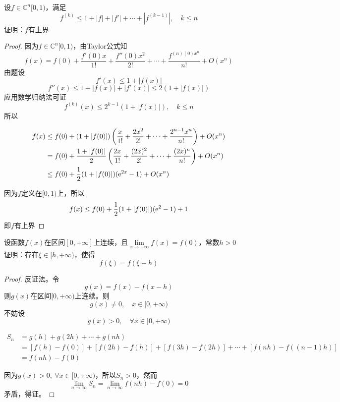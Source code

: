 \begin{proposition}
    
    设$f \in \mathbb{C}^{n}[0,1)$，满足
    $$f^{(k)} \leq 1 + |f| + |f'| + \cdots + |f^{(k-1)}|,\quad k \leq n$$
    证明：$f$有上界

\end{proposition}

\begin{proof}
    因为$f \in \mathbb{C}^{n}[0,1)$，由\textup{Taylor}公式知
    $$f(x) = f(0) + \dfrac{f'(0)x}{1!} + \dfrac{f''(0)x^2}{2!} + \cdots + \dfrac{f^{(n)(0)x^n}}{n!} + O(x^n)$$
    由题设
    $$f'(x) \leq 1 + |f(x)|$$
    $$f''(x) \leq 1 + |f(x)| + |f'(x)| \leq 2(1 + |f(x)|)$$
    应用数学归纳法可证
    $$f^{(k)}(x) \leq 2^{k-1}(1 + |f(x)|), \quad k \leq n$$
    所以

    \begin{align*}
        f(x) & \leq f(0) + (1 + |f(0)|)\left(\dfrac{x}{1!} + \dfrac{2x^2}{2!} + \cdots + \dfrac{2^{n-1}x^n}{n!}\right) + O(x^n) \\
        & = f(0) + \dfrac{1 + |f(0)|}{2}\left(\dfrac{2x}{1!} + \dfrac{(2x)^2}{2!} + \cdots + \dfrac{(2x)^{n}}{n!}\right) + O(x^n) \\
        & \leq f(0) + \dfrac{1}{2}(1 + |f(0)|)(\mathrm{e}^{2x}-1) + O(x^n)
    \end{align*}

    因为$f$定义在$[0,1)$上，所以
    $$f(x) \leq f(0) + \dfrac{1}{2}(1 + |f(0)|)(\mathrm{e}^2 - 1) + 1$$
    即$f$有上界
    
\end{proof}

\begin{proposition}
    设函数$f(x)$在区间$[0,+\infty]$上连续，且$\lim\limits_{x\to+\infty}{f(x)} = f(0)$，常数$h > 0$\\
    证明：存在$\xi \in [h,+\infty)$，使得
    $$f(\xi) = f(\xi - h)$$
\end{proposition}

\begin{proof}

    反证法。令
    $$g(x) = f(x) - f(x - h)$$
    则$g(x)$在区间$[0,+\infty)$上连续。则
    $$g(x) \neq 0, \quad x \in [0,+\infty)$$
    不妨设
    $$g(x) > 0, \quad \forall x \in [0,+\infty)$$
    
    \begin{align*}
        S_n & = g(h) + g(2h) + \cdots + g(nh) \\
        & = [f(h) - f(0)] + [f(2h) - f(h)] + [f(3h) - f(2h)] + \cdots + [f(nh) - f((n-1)h)] \\
        & = f(nh) - f(0)
    \end{align*}
  
    因为$g(x) > 0, \ \forall x \in [0,+\infty)$，所以$S_n > 0$，然而
    $$\lim\limits_{n\to\infty}{S_n} = \lim\limits_{n\to\infty}{f(nh)} - f(0) = 0$$
    矛盾，得证。

\end{proof}

